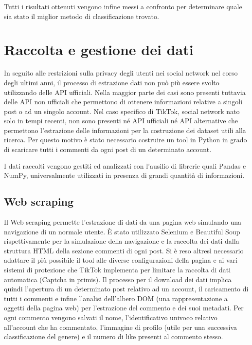 Tutti i risultati ottenuti vengono infine messi a confronto per determinare quale sia stato il miglior metodo di classificazione trovato.





\section{Raccolta e gestione dei dati}
In seguito alle restrizioni sulla privacy degli utenti nei social network nel corso degli ultimi anni, il processo di estrazione dati non può più essere svolto utilizzando delle API ufficiali. Nella maggior parte dei casi sono presenti tuttavia delle API non ufficiali che permettono di ottenere informazioni relative a singoli post o ad un singolo account. Nel caso specifico di TikTok, social network nato solo in tempi recenti, non sono presenti né API ufficiali né API alternative che permettono l'estrazione delle informazioni per la costruzione dei dataset utili alla ricerca. Per questo motivo è stato necessario costruire un tool in Python in grado di scaricare tutti i commenti da ogni post di un determinato account.

I dati raccolti vengono gestiti ed analizzati con l'ausilio di librerie quali Pandas e NumPy, universalmente utilizzati in presenza di grandi quantità di informazioni.

\subsection{Web scraping}
    Il Web scraping permette l'estrazione di dati da una pagina web simulando una navigazione di un normale utente. È stato utilizzato Selenium e Beautiful Soup rispettivamente per la simulazione della navigazione e la raccolta dei dati dalla struttura HTML della sezione commenti di ogni post. Si è reso altresì necessario adattare il più possibile il tool alle diverse configurazioni della pagina e ai vari sistemi di protezione che TikTok implementa per limitare la raccolta di dati automatica (Captcha in primis). Il processo per il download dei dati implica quindi l'apertura di un determinato post relativo ad un account, il caricamento di tutti i commenti e infine l'analisi dell'albero DOM (una rappresentazione a oggetti della pagina web) per l'estrazione del commento e dei suoi metadati. Per ogni commento vengono salvati il nome, l'identificativo univoco relativo all'account che ha commentato, l'immagine di profilo (utile per una successiva classificazione del genere) e il numero di like presenti al commento stesso.



